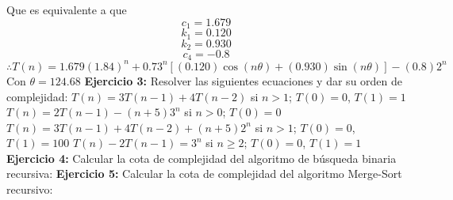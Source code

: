 \documentclass[12pt, letterpaper, twoside]{article}
\begin{document}
Que es equivalente a que
\[c_{1}=1.679\]
\[k_{1}=0.120\]
\[k_{2}=0.930\]
\[c_{4}=-0.8\]
\center
$\therefore T(n) = 1.679(1.84)^{n}+0.73^{n}[(0.120)\cos(n\theta)+(0.930)\sin(n\theta)]-(0.8)2^{n}$
Con $\theta=124.68$
\newpage
\justify
\textbf{Ejercicio 3:} Resolver las siguientes ecuaciones y dar su orden de complejidad:
\center
$T(n)=3T(n-1)+4T(n-2)$ si $n > 1$; $T(0)=0$, $T(1)=1$
\vspace{10mm}
\newline
$T(n)=2T(n-1)-(n+5)3^{n}$ si $n > 0$; $T(0)=0$
\vspace{10mm}
\newline
$T(n)=3T(n-1)+4T(n-2)+(n+5)2^{n}$ si $n > 1$; $T(0)=0$, $T(1)=100$
\vspace{10mm}
\newline
$T(n)-2T(n-1)=3^{n}$ si $n\geq2$; $T(0)=0$, $T(1)=1$
\newpage
\justify
\textbf{Ejercicio 4:} Calcular la cota de complejidad del algoritmo de búsqueda binaria recursiva:
\newpage
\justify
\textbf{Ejercicio 5:} Calcular la cota de complejidad del algoritmo Merge-Sort recursivo:
\end{document}

